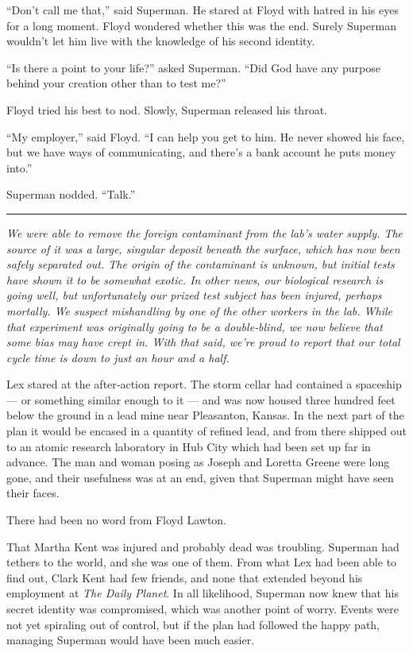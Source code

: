 ``Don't call me that,'' said Superman. He stared at Floyd with hatred in
his eyes for a long moment. Floyd wondered whether this was the end.
Surely Superman wouldn't let him live with the knowledge of his second
identity.

``Is there a point to your life?'' asked Superman. ``Did God have any
purpose behind your creation other than to test me?''

Floyd tried his best to nod. Slowly, Superman released his throat.

``My employer,'' said Floyd. ``I can help you get to him. He never
showed his face, but we have ways of communicating, and there's a bank
account he puts money into.''

Superman nodded. ``Talk.''

\begin{center}\rule{0.5\linewidth}{0.5pt}\end{center}

\emph{We were able to remove the foreign contaminant from the lab's
water supply. The source of it was a large, singular deposit beneath the
surface, which has now been safely separated out. The origin of the
contaminant is unknown, but initial tests have shown it to be somewhat
exotic. In other news, our biological research is going well, but
unfortunately our prized test subject has been injured, perhaps
mortally. We suspect mishandling by one of the other workers in the lab.
While that experiment was originally going to be a double‐blind, we now
believe that some bias may have crept in. With that said, we're proud to
report that our total cycle time is down to just an hour and a half.}

Lex stared at the after‐action report. The storm cellar had contained a
spaceship --- or something similar enough to it --- and was now housed
three hundred feet below the ground in a lead mine near Pleasanton,
Kansas. In the next part of the plan it would be encased in a quantity
of refined lead, and from there shipped out to an atomic research
laboratory in Hub City which had been set up far in advance. The man and
woman posing as Joseph and Loretta Greene were long gone, and their
usefulness was at an end, given that Superman might have seen their
faces.

There had been no word from Floyd Lawton.

That Martha Kent was injured and probably dead was troubling. Superman
had tethers to the world, and she was one of them. From what Lex had
been able to find out, Clark Kent had few friends, and none that
extended beyond his employment at \emph{The Daily Planet}. In all
likelihood, Superman now knew that his secret identity was compromised,
which was another point of worry. Events were not yet spiraling out of
control, but if the plan had followed the happy path, managing Superman
would have been much easier.

